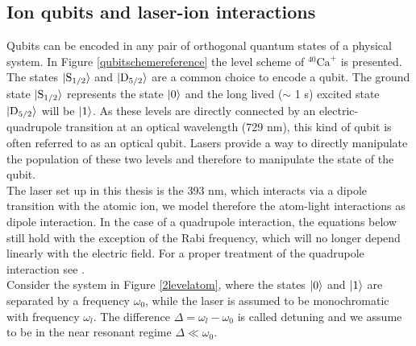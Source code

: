\subsection{Ion qubits and laser-ion interactions}
\label{laserioninteractions}
Qubits can be encoded in any pair of orthogonal quantum states of a physical system. %
In Figure \ref{qubitschemereference} the level scheme of $^{40}\text{Ca}^+$ is presented. The states $\ket{\text{S}_{1/2}}$ and $\ket{\text{D}_{5/2}}$ are a common choice to encode a qubit. The ground state $\ket{\text{S}_{1/2}}$ represents the state $\ket{0}$ and the long lived ($\sim$ 1 s) excited state $\ket{\text{D}_{5/2}}$ will be $\ket{1}$. As these levels are directly connected by an electric-quadrupole transition at an optical wavelength (729 nm), this kind of qubit is often referred to as an optical qubit.
Lasers provide a way to directly manipulate the population of these two levels and therefore to manipulate the state of the qubit.\\
The laser set up in this thesis is the 393 nm, which interacts via a dipole transition with the atomic ion, we model therefore the atom-light interactions as dipole interaction. In the case of a quadrupole interaction, the equations below still hold with the exception of the Rabi frequency, which will no longer depend linearly with the electric field. For a proper treatment of the quadrupole interaction see \cite{ross}.\\
Consider the system in Figure \ref{2levelatom}, where the states $\ket{0}$ and $\ket{1}$ are separated by a frequency $\omega_0$, while the laser is assumed to be monochromatic with frequency $\omega_l$. The difference $\Delta = \omega_l -\omega_0$ is called detuning and we assume to be in the near resonant regime $\Delta \ll \omega_0$. %
